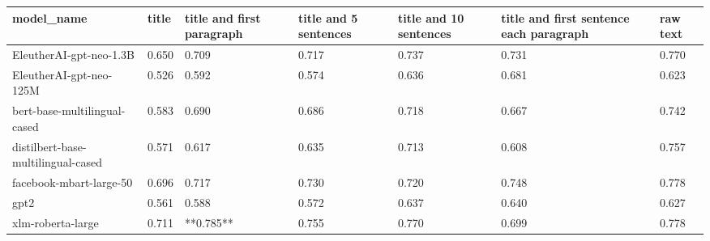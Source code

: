 \begin{tabular}{lllllll}
\toprule
                        model\_name & title & title and first paragraph & title and 5 sentences & title and 10 sentences & title and first sentence each paragraph & raw text \\
\midrule
           EleutherAI-gpt-neo-1.3B & 0.650 &                     0.709 &                 0.717 &                  0.737 &                                   0.731 &    0.770 \\
           EleutherAI-gpt-neo-125M & 0.526 &                     0.592 &                 0.574 &                  0.636 &                                   0.681 &    0.623 \\
      bert-base-multilingual-cased & 0.583 &                     0.690 &                 0.686 &                  0.718 &                                   0.667 &    0.742 \\
distilbert-base-multilingual-cased & 0.571 &                     0.617 &                 0.635 &                  0.713 &                                   0.608 &    0.757 \\
           facebook-mbart-large-50 & 0.696 &                     0.717 &                 0.730 &                  0.720 &                                   0.748 &    0.778 \\
                              gpt2 & 0.561 &                     0.588 &                 0.572 &                  0.637 &                                   0.640 &    0.627 \\
                 xlm-roberta-large & 0.711 &                 **0.785** &                 0.755 &                  0.770 &                                   0.699 &    0.778 \\
\bottomrule
\end{tabular}

